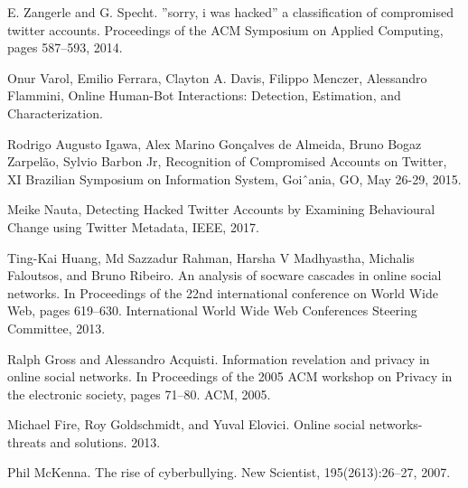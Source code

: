 \documentclass[conference]{IEEEtran}
\begin{document}
\begin{enumerate}[label={[\arabic*]}]
\item E. Zangerle and G. Specht. ”sorry, i was hacked” a
classification of compromised twitter accounts.
Proceedings of the ACM Symposium on Applied
Computing, pages 587–593, 2014.
\item Onur Varol, Emilio Ferrara, Clayton A. Davis, Filippo Menczer, Alessandro Flammini, Online Human-Bot Interactions: Detection, Estimation, and Characterization.
\item Rodrigo Augusto Igawa, Alex Marino Gonçalves de Almeida, Bruno Bogaz Zarpelão, Sylvio Barbon Jr,
Recognition of Compromised Accounts on Twitter, XI Brazilian Symposium on Information System, Goiˆania, GO, May 26-29, 2015.
\item Meike Nauta, Detecting Hacked Twitter Accounts by Examining
Behavioural Change using Twitter Metadata, IEEE, 2017.
\item Ting-Kai Huang, Md Sazzadur Rahman, Harsha V
Madhyastha, Michalis Faloutsos, and Bruno Ribeiro. An
analysis of socware cascades in online social networks.
In Proceedings of the 22nd international conference on
World Wide Web, pages 619–630. International World
Wide Web Conferences Steering Committee, 2013.
\item Ralph Gross and Alessandro Acquisti. Information
revelation and privacy in online social networks. In
Proceedings of the 2005 ACM workshop on Privacy in
the electronic society, pages 71–80. ACM, 2005.
\item Michael Fire, Roy Goldschmidt, and Yuval Elovici.
Online social networks- threats and solutions. 2013.
\item Phil McKenna. The rise of cyberbullying. New
Scientist, 195(2613):26–27, 2007.\\\\\\\\\\\\\\\\\\\\\\\\\\\\\\\\\\\\\\\\\\\\\\\\\\\\\\\\\\\\\\\\


\end{enumerate}
\end{document}
